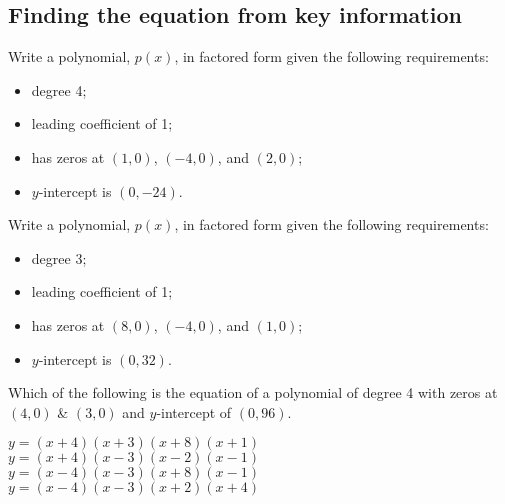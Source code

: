 \ifprintanswers\else\newpage\fi

\subsection{Finding the equation from key information}

\begin{exercise}
Write a polynomial, $p(x)$, in factored form given the following requirements:
\begin{itemize}
    \item degree 4;
    \item leading coefficient of 1;
    \item has zeros at $(1,0)$, $(-4,0)$, and $(2,0)$;
    \item $y$-intercept is $(0,-24)$.
\end{itemize}
\end{exercise}
\begin{solution}[3in]

\end{solution}

\begin{exercise}
Write a polynomial, $p(x)$, in factored form given the following requirements:
\begin{itemize}
    \item degree 3;
    \item leading coefficient of 1;
    \item has zeros at $(8,0)$, $(-4,0)$, and $(1,0)$;
    \item $y$-intercept is $(0,32)$.
\end{itemize}
\end{exercise}
\begin{solution}[2in]

\end{solution}

\begin{exercise}
Which of the following is the equation of a polynomial of degree 4 with zeros at
$(4,0)$ \& $(3,0)$ and $y$-intercept of $(0,96)$.
\end{exercise}
\begin{checkboxes}
\choice $y=(x+4)(x+3)(x+8)(x+1)$
\choice $y=(x+4)(x-3)(x-2)(x-1)$
\choice $y=(x-4)(x-3)(x+8)(x-1)$
\CorrectChoice $y=(x-4)(x-3)(x+2)(x+4)$
\end{checkboxes}
\begin{solution}[2in]

\end{solution}

